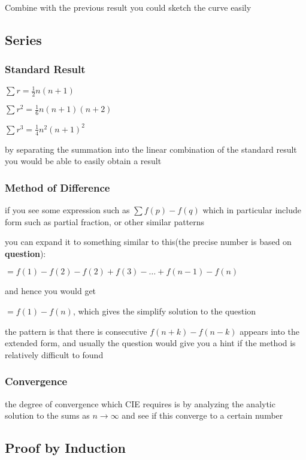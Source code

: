 \documentclass[]{article}
\begin{document}
Combine with the previous result you could sketch the curve easily

\subsection{Series}\label{header-n1154}

\subsubsection{Standard Result}\label{header-n1155}

\(\sum{r} =\frac{1}{2}n(n+1)\)

\(\sum r^2 = \frac{1}{6}n(n+1)(n+2)\)

\(\sum r^3 = \frac{1}{4}n^2(n+1)^2\)

by separating the summation into the linear combination of the standard
result you would be able to easily obtain a result

\subsubsection{Method of Difference}\label{header-n1164}

if you see some expression such as \(\sum f(p) - f(q)\) which in
particular include form such as partial fraction, or other similar
patterns

you can expand it to something similar to this(the precise number is
based on \textbf{question}):

\(= f(1) - f(2) - f(2) + f(3) -\dots + f(n-1) - f(n)\)

and hence you would get

\( = f(1) - f(n)\), which gives the simplify solution to the question

the pattern is that there is consecutive \(f(n+k) - f(n-k)\) appears
into the extended form, and usually the question would give you a hint
if the method is relatively difficult to found

\subsubsection{Convergence}\label{header-n1177}

the degree of convergence which CIE requires is by analyzing the
analytic solution to the sums as \(n \rightarrow \infty\) and see if
this converge to a certain number

\subsection{Proof by Induction}\label{header-n1180}
\end{document}
